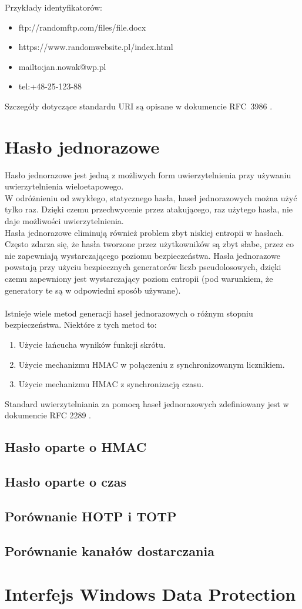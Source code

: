 Przykłady identyfikatorów:
\begin{itemize}
	\item ftp://randomftp.com/files/file.docx
	\item https://www.randomwebsite.pl/index.html
	\item mailto:jan.nowak@wp.pl
	\item tel:+48-25-123-88
\end{itemize}

Szczegóły dotyczące standardu URI są opisane w dokumencie RFC~3986 \cite{uri}. 

 
\section{Hasło jednorazowe}
Hasło jednorazowe jest jedną z możliwych form uwierzytelnienia przy używaniu uwierzytelnienia wieloetapowego. \\
W odróżnieniu od zwykłego, statycznego hasła, haseł jednorazowych można użyć tylko raz. 
Dzięki czemu przechwycenie przez atakującego, raz użytego hasła, nie daje możliwości uwierzytelnienia. \\
Hasła jednorazowe eliminują również problem zbyt niskiej entropii w hasłach. 
Często zdarza się, że hasła tworzone przez użytkowników są zbyt słabe, przez co nie zapewniają wystarczającego
poziomu bezpieczeństwa. Hasła jednorazowe powstają przy użyciu bezpiecznych generatorów liczb pseudolosowych, 
dzięki czemu zapewniony jest wystarczający poziom entropii (pod warunkiem, że generatory te są w odpowiedni 
sposób używane). \\ \\
Istnieje wiele metod generacji haseł jednorazowych o różnym stopniu bezpieczeństwa. 
Niektóre z tych metod to:
\begin{enumerate}
	\item Użycie łańcucha wyników funkcji skrótu.
	\item Użycie mechanizmu HMAC w połączeniu z synchronizowanym licznikiem.
	\item Użycie mechanizmu HMAC z synchronizacją czasu.
\end{enumerate}
Standard uwierzytelniania za pomocą haseł jednorazowych zdefiniowany jest w dokumencie RFC 2289 \cite{otprfc}.

\subsection{Hasło oparte o HMAC}


\subsection{Hasło oparte o czas}
\subsection{Porównanie HOTP i TOTP}
\subsection{Porównanie kanałów dostarczania}

\section{Interfejs Windows Data Protection}
